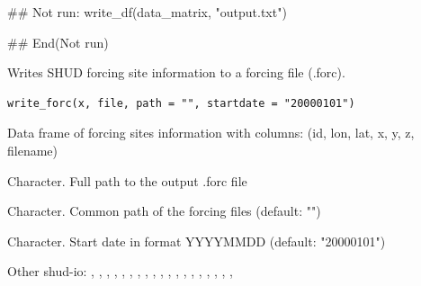 \documentclass[a4paper]{book}
\begin{document}
%
\begin{Examples}
\begin{ExampleCode}
## Not run: 
write_df(data_matrix, "output.txt")

## End(Not run)
\end{ExampleCode}
\end{Examples}
%
\begin{Description}\relax
Writes SHUD forcing site information to a forcing file (.forc).
\end{Description}
%
\begin{Usage}
\begin{verbatim}
write_forc(x, file, path = "", startdate = "20000101")
\end{verbatim}
\end{Usage}
%
\begin{Arguments}
\begin{ldescription}
\item[\code{x}] Data frame of forcing sites information with columns:
(id, lon, lat, x, y, z, filename)

\item[\code{file}] Character. Full path to the output .forc file

\item[\code{path}] Character. Common path of the forcing files (default: "")

\item[\code{startdate}] Character. Start date in format YYYYMMDD (default: "20000101")
\end{ldescription}
\end{Arguments}
%
\begin{SeeAlso}\relax
Other shud-io: 
,
,
,
,
,
,
,
,
,
,
,
,
,
,
,
,
,
,
,
\end{SeeAlso}
\end{document}
